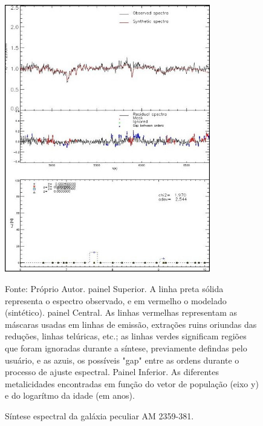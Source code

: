 \begin{figure}[H]
	\centering	
    \caption{Síntese espectral da galáxia peculiar AM 2359-381.}
    \includegraphics[width=0.8\textwidth]{figuras/normal.jpg}
   	\begin{center}
        \normalsize Fonte: Próprio Autor. painel Superior. A linha preta sólida representa o espectro observado, e em vermelho o modelado (sintético). painel Central. As linhas vermelhas representam as máscaras usadas em linhas de emissão, extrações ruins oriundas das reduções, linhas telúricas, etc.; as linhas verdes significam regiões que foram ignoradas durante a síntese, previamente defindas pelo usuário, e as azuis, os possíveis "gap" entre as ordens durante o processo de ajuste espectral. Painel Inferior. As diferentes metalicidades encontradas em função do vetor de população (eixo y) e do logarítmo da idade (em anos).
    \end{center}
	\label{fig:sbmt-moses}
\end{figure}


